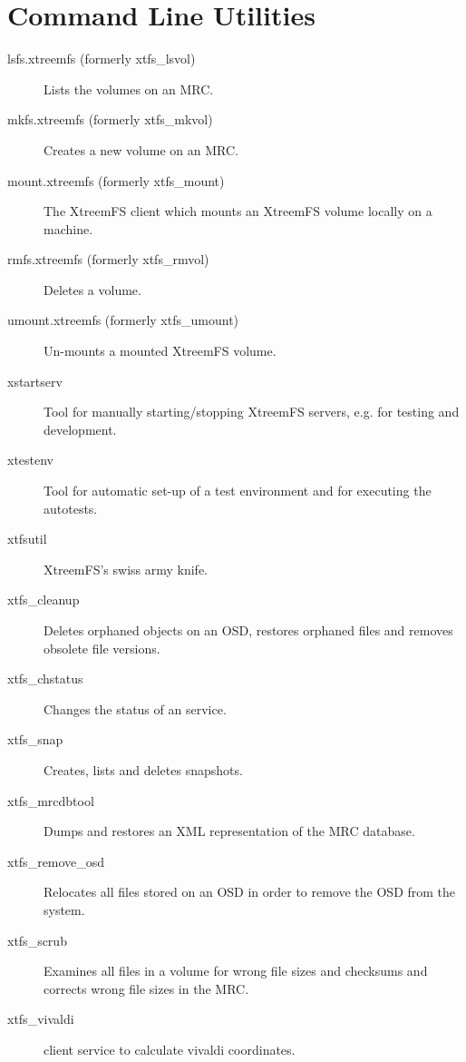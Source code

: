 \documentclass[a4paper,10pt]{book}
\begin{document}
\chapter{Command Line Utilities}
\label{sec:cli_utils}

\begin{description}
 \item[lsfs.xtreemfs (formerly xtfs\_lsvol)] Lists the volumes on an MRC.
 \item[mkfs.xtreemfs (formerly xtfs\_mkvol)] Creates a new volume on an MRC.
 \item[mount.xtreemfs (formerly xtfs\_mount)] The XtreemFS client which mounts an XtreemFS volume locally on a machine.
 \item[rmfs.xtreemfs (formerly xtfs\_rmvol)] Deletes a volume.
 \item[umount.xtreemfs (formerly xtfs\_umount)] Un-mounts a mounted XtreemFS volume.
 \item[xstartserv] Tool for manually starting/stopping XtreemFS servers, e.g. for testing and development.
 \item[xtestenv] Tool for automatic set-up of a test environment and for executing the autotests.
 \item[xtfsutil] XtreemFS's swiss army knife.
 \item[xtfs\_cleanup] Deletes orphaned objects on an OSD, restores orphaned files and removes obsolete file versions.
 \item[xtfs\_chstatus] Changes the status of an service.
 \item[xtfs\_snap] Creates, lists and deletes snapshots.
 \item[xtfs\_mrcdbtool] Dumps and restores an XML representation of the MRC database.
 \item[xtfs\_remove\_osd] Relocates all files stored on an OSD in order to remove the OSD from the system.
 \item[xtfs\_scrub] Examines all files in a volume for wrong file sizes and checksums and corrects wrong file sizes in the MRC.
 \item[xtfs\_vivaldi] client service to calculate vivaldi coordinates.
\end{description}

\printindex
\end{document}
